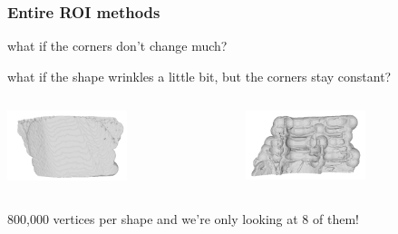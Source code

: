 \documentclass{beamer} %
\theoremstyle{definition} %
\begin{document}
\begin{frame}
\frametitle{Entire ROI methods}
what if the corners don't change much? 



what if the shape wrinkles a little bit, but the corners stay constant?


\vspace{1cm}
\begin{columns}
\begin{column}{0.5\textwidth} %

\begin{center}
\includegraphics[width=3.5cm, ]{../images/snapshot_top01.png}
\end{center}

\end{column}


\begin{column}{0.5\textwidth} %

\begin{center}
\includegraphics[width=3.5cm, ]{../images/snapshot_bottom00.png}
\end{center}

\end{column}


\end{columns}
\pause

\vspace{1cm}

800,000 vertices per shape and we're only looking at 8 of them!


\end{frame}
\end{document}
